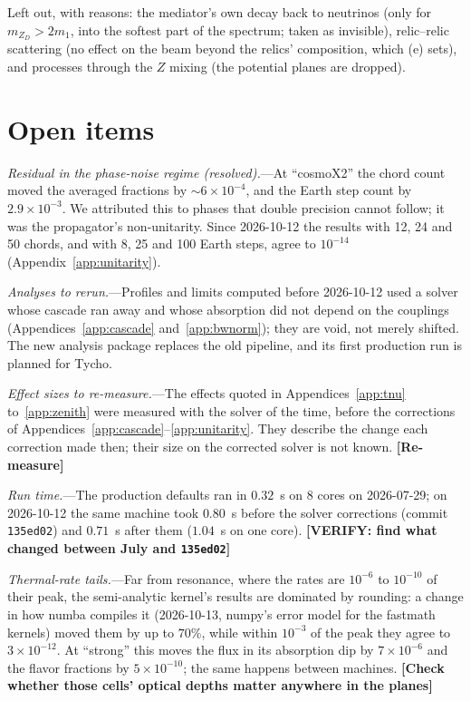 \documentclass[11pt,a4paper]{article}
\newcommand{\note}[1]{\textbf{[#1]}}
\newcommand{\mzd}{m_{Z_D}}
\begin{document}
Left out, with reasons: the mediator's own decay back to neutrinos (only for $\mzd > 2m_1$, into the softest part of
the spectrum; taken as invisible), relic--relic scattering (no effect on the beam beyond the relics' composition,
which (e) sets), and processes through the $Z$ mixing (the potential planes are dropped).

\section{Open items}
\label{sec:open}

\textit{Residual in the phase-noise regime (resolved).}---At ``cosmoX2'' the chord count moved
the averaged fractions by $\sim6\times10^{-4}$, and the Earth step count by $2.9\times10^{-3}$. We
attributed this to phases that double precision cannot follow; it was the propagator's
non-unitarity. Since 2026-10-12 the results with 12, 24 and 50 chords, and with 8, 25 and 100
Earth steps, agree to $10^{-14}$ (Appendix~\ref{app:unitarity}).

\textit{Analyses to rerun.}---Profiles and limits computed before 2026-10-12 used a solver whose
cascade ran away and whose absorption did not depend on the couplings
(Appendices~\ref{app:cascade} and~\ref{app:bwnorm}); they are void, not merely shifted. The new
analysis package replaces the old pipeline, and its first production run is planned for Tycho.

\textit{Effect sizes to re-measure.}---The effects quoted in Appendices~\ref{app:tnu}
to~\ref{app:zenith} were measured with the solver of the time, before the corrections of
Appendices~\ref{app:cascade}--\ref{app:unitarity}. They describe the change each correction made
then; their size on the corrected solver is not known. \note{Re-measure}

\textit{Run time.}---The production defaults ran in $0.32$~s on 8 cores on 2026-07-29; on
2026-10-12 the same machine took $0.80$~s before the solver corrections (commit
\texttt{135ed02}) and $0.71$~s after them ($1.04$~s on one core). \note{VERIFY: find what
changed between July and \texttt{135ed02}}

\textit{Thermal-rate tails.}---Far from resonance, where the rates are $10^{-6}$ to $10^{-10}$ of
their peak, the semi-analytic kernel's results are dominated by rounding: a change in how numba
compiles it (2026-10-13, numpy's error model for the fastmath kernels) moved them by up to
$70\%$, while within $10^{-3}$ of the peak they agree to $3\times10^{-12}$. At ``strong'' this moves
the flux in its absorption dip by $7\times10^{-6}$ and the flavor fractions by $5\times10^{-10}$; the
same happens between machines. \note{Check whether those cells' optical depths matter anywhere in
the planes}
\end{document}
